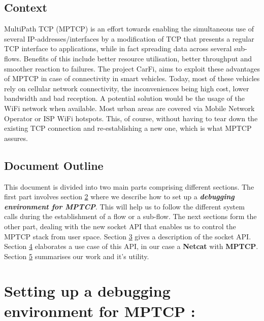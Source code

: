 \documentclass[a4paper,11pt]{article}
\begin{document}
		\subsection{Context}
			\begin{description}
				\item \hspace{2cm} MultiPath TCP (MPTCP) is an effort towards enabling the simultaneous use of several IP-addresses/interfaces by a modification of TCP that presents a regular TCP interface to applications, while in fact spreading data across several sub-flows. Benefits of this include better resource utilisation, better throughput and smoother reaction to failures. The project CarFi, aims to exploit these advantages of MPTCP in case of connectivity in smart vehicles. Today, most of these vehicles rely on cellular network connectivity, the inconveniences being high cost, lower bandwidth and bad reception. A potential solution would be the usage of the WiFi network when available. Most urban areas are covered via Mobile Network Operator or ISP WiFi hotspots. This, of course, without having to tear down the existing TCP connection and re-establishing a new one, which is what MPTCP assures.
			\end{description}
	
		\vspace{0.5cm}
		\subsection{Document Outline}
			\begin{description}
				\item \hspace{2cm} This document is divided into two main parts comprising different sections. The first part involves section \hyperref[sec:mptcpdebug]{2} where we describe how to set up a \textbf{\emph{debugging environment for MPTCP}}. This will help us to follow the different system calls during the establishment of a flow or a sub-flow. The next sections form the other part, dealing with the new socket API that enables us to control the MPTCP stack from user space. Section \hyperref[sec:mptcpapi]{3} gives a description of the socket API. Section \hyperref[sec:netcat-mptcp]{4} elaborates a use case of this API, in our case a \textbf{Netcat} with \textbf{MPTCP}. Section \hyperref[sec:conclusion]{5} summarises our work and it's utility.
			\end{description}


	\clearpage
	\section{Setting up a debugging environment for MPTCP : }
\end{document}

